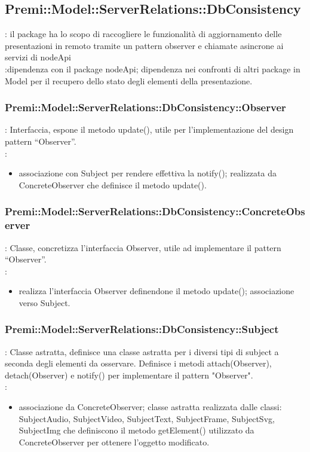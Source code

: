 \subsection{Premi::Model::ServerRelations::DbConsistency}{
		\textbf{\tipo}: il package ha lo scopo di raccogliere le funzionalità di aggiornamento delle presentazioni in remoto tramite un pattern observer e chiamate asincrone ai servizi di nodeApi\\
		\textbf{\relaz}:dipendenza con il package nodeApi; dipendenza nei confronti di altri package in Model per il recupero dello stato degli elementi della presentazione.\\
       
       \subsubsection{Premi::Model::ServerRelations::DbConsistency::Observer}{
				\textbf{\tipo}: Interfaccia, espone il metodo update(), utile per l’implementazione del design pattern “Observer”.\\	
				\textbf{\relaz}: 
				\begin{itemize}
					\item associazione con Subject per rendere effettiva la notify(); realizzata da ConcreteObserver che definisce il metodo update().
				\end{itemize}	
            }
            
            
            \subsubsection{Premi::Model::ServerRelations::DbConsistency::ConcreteObserver}{
				\textbf{\tipo}: Classe, concretizza l’interfaccia Observer, utile ad implementare il pattern “Observer”.\\	
				\textbf{\relaz}: 
				\begin{itemize}
					\item realizza l’interfaccia Observer definendone il metodo update(); associazione verso Subject.
				\end{itemize}	
            }
            
             \subsubsection{Premi::Model::ServerRelations::DbConsistency::Subject}{
				\textbf{\tipo}: Classe astratta, definisce una classe astratta per i diversi tipi di subject a seconda degli elementi da osservare. Definisce i metodi attach(Observer), detach(Observer) e notify() per implementare il pattern "Observer".\\	
				\textbf{\relaz}: 
				\begin{itemize}
					\item associazione da ConcreteObserver; classe astratta realizzata dalle classi: SubjectAudio, SubjectVideo, SubjectText, SubjectFrame, SubjectSvg, SubjectImg che definiscono il metodo getElement() utilizzato da ConcreteObserver per ottenere l’oggetto modificato.
				\end{itemize}	
            }
            
}
